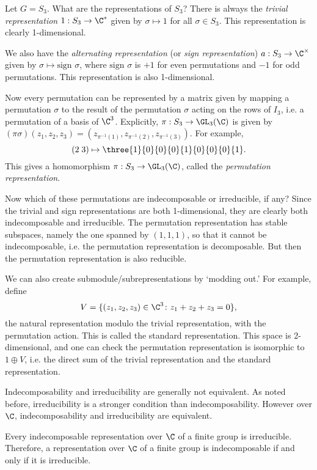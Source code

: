 \begin{ex} \label{ex:s3rep}
Let $G=S_3$. What are the representations of $S_3$? There is always the \emph{trivial representation} $1: S_3 \to \C^*$ given by $\sigma \mapsto 1$ for all $\sigma \in S_3$. This representation is clearly 1-dimensional. 

We also have the \emph{alternating representation} (or \emph{sign representation}) $a: S_3 \to \C^\times$ given by $\sigma \mapsto \text{sign }\sigma$, where $\text{sign }\sigma$ is $+1$ for even permutations and $-1$ for odd permutations. This representation is also 1-dimensional. 

Now every permutation can be represented by a matrix given by mapping a permutation $\sigma$ to the result of the permutation $\sigma$ acting on the rows of $I_3$, i.e. a permutation of a basis of $\C^3$. Explicitly, $\pi: S_3 \to \GL_3(\C)$ is given by $(\pi \sigma)(z_1,z_2,z_3)=(z_{\pi^{-1}(1)}, z_{\pi^{-1}(2)}, z_{\pi^{-1}(3)})$. For example,
	\[
	(2\;3) \mapsto \three{1}{0}{0}{0}{1}{0}{0}{0}{1}.
	\]
This gives a homomorphism $\pi: S_3 \to \GL_3(\C)$, called the \emph{permutation representation}. 

Now which of these permutations are indecomposable or irreducible, if any? Since the trivial and sign representations are both 1-dimensional, they are clearly both indecomposable and irreducible. The permutation representation has stable subspaces, namely the one spanned by $(1,1,1)$, so that it cannot be indecomposable, i.e. the permutation representation is decomposable. But then the permutation representation is also reducible. 

We can also create submodule/subrepresentations by `modding out.' For example, define 
	\[
	V=\{ (z_1,z_2,z_3) \in \C^3 \colon z_1+z_2+z_3=0\},
	\]
the natural representation modulo the trivial representation, with the permutation action. This is called the standard representation. This space is 2-dimensional, and one can check the permutation representation is isomorphic to $1 \oplus V$, i.e. the direct sum of the trivial representation and the standard representation. \xqed
\end{ex}


Indecomposability and irreducibility are generally not equivalent. As noted before, irreducibility is a stronger condition than indecomposability. However over $\C$, indecomposability and irreducibility are equivalent. 


\begin{thm}
Every indecomposable representation over $\C$ of a finite group is irreducible. Therefore, a representation over $\C$ of a finite group is indecomposable if and only if it is irreducible.
\end{thm}

